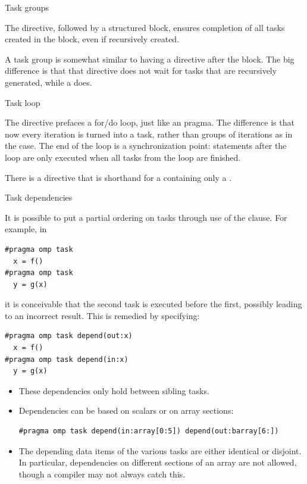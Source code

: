 
 {Task groups}
\label{sec:omp-task-group}

The  directive, followed
by a structured block, ensures completion of all tasks
created in the block, even if recursively created.

A task group is somewhat similar to having a 
directive after the block. The big difference is that that
 directive does not wait for tasks that are recursively
generated, while a  does.

 {Task loop}
\label{sec:omp-task-loop}

The  directive
prefaces a for/do loop, just like an  pragma.
The difference is that now every iteration is turned into a task,
rather than groups of iterations as in the  case.
The end of the loop is a synchronization point:
statements after the loop are only executed
when all tasks from the loop are finished.

There is a  directive
that is shorthand for a 
containing only a .

 {Task dependencies}
\label{sec:omp-task-depend}

It is possible to put a partial ordering on
tasks through use of the  clause. For example, in
\begin{lstlisting}[language=omp]
#pragma omp task
  x = f()
#pragma omp task
  y = g(x)
\end{lstlisting}
it is conceivable that the second task is executed before the first,
possibly leading to an incorrect result. This is remedied by specifying:
\begin{lstlisting}[language=omp]
#pragma omp task depend(out:x)
  x = f()
#pragma omp task depend(in:x)
  y = g(x)
\end{lstlisting}

\begin{itemize}
\item
  These dependencies only hold between sibling tasks.
\item Dependencies can be based on scalars or on array sections:
\begin{lstlisting}
#pragma omp task depend(in:array[0:5]) depend(out:barray[6:])
\end{lstlisting}
\item The depending data items of the various tasks
  are either identical or disjoint.
  In particular, dependencies on different sections of an array
  are not allowed, though a compiler may not always catch this.
\end{itemize}

